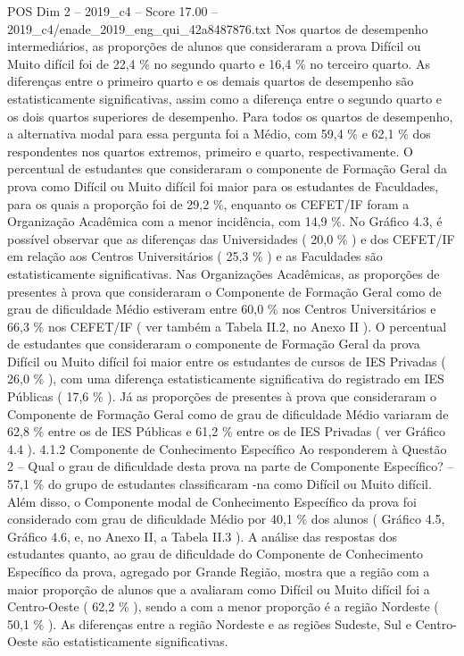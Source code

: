 \begin{textsample}{POS Dim 2 – 2019\_c4 – Score 17.00 – 2019\_c4/enade\_2019\_eng\_qui\_42a8487876.txt}
Nos quartos de desempenho intermediários, as proporções de alunos que consideraram a prova Difícil ou Muito difícil foi de 22,4 \% no segundo quarto e 16,4 \% no terceiro quarto.
As diferenças entre o primeiro quarto e os demais quartos de desempenho são estatisticamente significativas, assim como a diferença entre o segundo quarto e os dois quartos superiores de desempenho.
Para todos os quartos de desempenho, a alternativa modal para essa pergunta foi a Médio, com 59,4 \% e 62,1 \% dos respondentes nos quartos extremos, primeiro e quarto, respectivamente.
O percentual de estudantes que consideraram o componente de Formação Geral da prova como Difícil ou Muito difícil foi maior para os estudantes de Faculdades, para os quais a proporção foi de 29,2 \%, enquanto os CEFET/IF foram a Organização Acadêmica com a menor incidência, com 14,9 \%.
No Gráfico 4.3, é possível observar que as diferenças das Universidades ( 20,0 \% ) e dos CEFET/IF em relação aos Centros Universitários ( 25,3 \% ) e as Faculdades são estatisticamente significativas.
Nas Organizações Acadêmicas, as proporções de presentes à prova que consideraram o Componente de Formação Geral como de grau de dificuldade Médio estiveram entre 60,0 \% nos Centros Universitários e 66,3 \% nos CEFET/IF ( ver também a Tabela II.2, no Anexo II ).
O percentual de estudantes que consideraram o componente de Formação Geral da prova Difícil ou Muito difícil foi maior entre os estudantes de cursos de IES Privadas ( 26,0 \% ), com uma diferença estatisticamente significativa do registrado em IES Públicas ( 17,6 \% ).
Já as proporções de presentes à prova que consideraram o Componente de Formação Geral como de grau de dificuldade Médio variaram de 62,8 \% entre os de IES Públicas e 61,2 \% entre os de IES Privadas ( ver Gráfico 4.4 ). 4.1.2 Componente de Conhecimento Específico Ao responderem à Questão 2 – Qual o grau de dificuldade desta prova na parte de Componente Específico? – 57,1 \% do grupo de estudantes classificaram -na como Difícil ou Muito difícil.
Além disso, o Componente modal de Conhecimento Específico da prova foi considerado com grau de dificuldade Médio por 40,1 \% dos alunos ( Gráfico 4.5, Gráfico 4.6, e, no Anexo II, a Tabela II.3 ).
A análise das respostas dos estudantes quanto, ao grau de dificuldade do Componente de Conhecimento Específico da prova, agregado por Grande Região, mostra que a região com a maior proporção de alunos que a avaliaram como Difícil ou Muito difícil foi a Centro-Oeste ( 62,2 \% ), sendo a com a menor proporção é a região Nordeste ( 50,1 \% ).
As diferenças entre a região Nordeste e as regiões Sudeste, Sul e Centro-Oeste são estatisticamente significativas.

\end{textsample}

